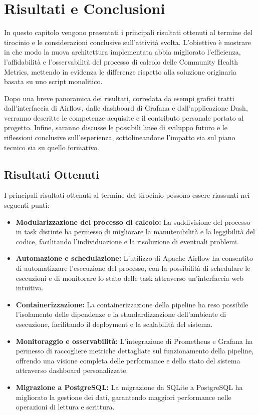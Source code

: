 \chapter{Risultati e Conclusioni}
\label{cha:risultaticonclusioni}

In questo capitolo vengono presentati i principali risultati ottenuti al termine del tirocinio e le 
considerazioni conclusive sull’attività svolta. L’obiettivo è mostrare in che modo la nuova architettura 
implementata abbia migliorato l’efficienza, l’affidabilità e l’osservabilità del processo di calcolo delle 
Community Health Metrics, mettendo in evidenza le differenze rispetto alla soluzione originaria 
basata su uno script monolitico. 

Dopo una breve panoramica dei risultati, corredata da esempi grafici tratti dall’interfaccia di 
Airflow, dalle dashboard di Grafana e dall’applicazione Dash, verranno descritte le competenze acquisite 
e il contributo personale portato al progetto. Infine, saranno discusse le possibili linee di sviluppo futuro 
e le riflessioni conclusive sull’esperienza, sottolineandone l’impatto sia sul piano tecnico sia su quello 
formativo.

\section{Risultati Ottenuti}
\label{sec:risultatiottenuti}

I principali risultati ottenuti al termine del tirocinio possono essere riassunti nei seguenti punti:

\begin{itemize}
    \item \textbf{Modularizzazione del processo di calcolo:} La suddivisione del processo in task distinte ha permesso di migliorare la manutenibilità e la leggibilità del codice, facilitando l’individuazione e la risoluzione di eventuali problemi.
    \item \textbf{Automazione e schedulazione:} L’utilizzo di Apache Airflow ha consentito di automatizzare l’esecuzione del processo, con la possibilità di schedulare le esecuzioni e di monitorare lo stato delle task attraverso un’interfaccia web intuitiva.
    \item \textbf{Containerizzazione:} La containerizzazione della pipeline ha reso possibile l’isolamento delle dipendenze e la standardizzazione dell’ambiente di esecuzione, facilitando il deployment e la scalabilità del sistema. 
    \item \textbf{Monitoraggio e osservabilità:} L’integrazione di Prometheus e Grafana ha permesso di raccogliere metriche dettagliate sul funzionamento della pipeline, offrendo una visione completa delle performance e dello stato del sistema attraverso dashboard personalizzate.
    \item \textbf{Migrazione a PostgreSQL:} La migrazione da SQLite a PostgreSQL ha migliorato la gestione dei dati, garantendo maggiori performance nelle operazioni di lettura e scrittura.
\end{itemize}

